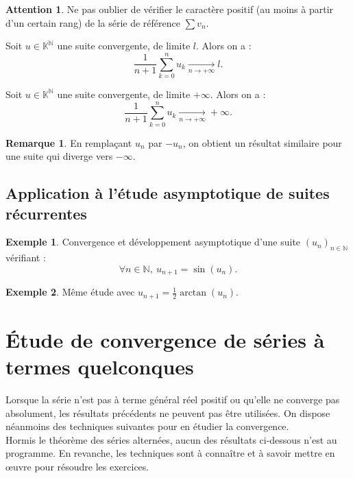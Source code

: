 \documentclass[french]{article}
\newcommand{\N}{\mathbb{N}}
\newcommand{\K}{\mathbb{K}}
\theoremstyle{plain}
\theoremstyle{definition}
\newtheorem*{ex}{Exemple}
\newtheorem*{rmq}{Remarque}
\newtheorem*{attention}{Attention}
\theoremstyle{remark}
\begin{document}
\begin{attention}
	Ne pas oublier de vérifier le caractère positif (au moins à partir d'un certain rang) de la série de référence $\displaystyle\sum v_n$.
\end{attention}

\begin{prop}%
	Soit $u\in\K^\N$ une suite convergente, de limite $l$. Alors on a : 
	$$\frac{1}{n+1}\sum_{k=0}^{n}u_k\xrightarrow[n\to+\infty]{}l.$$
\end{prop}

\begin{prop}%
	Soit $u\in\K^\N$ une suite convergente, de limite $+\infty$. Alors on a : 
	$$\frac{1}{n+1}\sum_{k=0}^{n}u_k\xrightarrow[n\to+\infty]{}+\infty.$$
\end{prop}

\begin{rmq}
	En remplaçant $u_n$ par $-u_n$, on obtient un résultat similaire pour une suite qui diverge vers $-\infty$.
\end{rmq}

\subsection{Application à l'étude asymptotique de suites récurrentes}

\begin{ex}
	Convergence et développement asymptotique d'une suite $(u_n)_{n\in\N}$ vérifiant : $$\forall n\in\N,\ u_{n+1}=\sin(u_n).$$
\end{ex}

\begin{ex}
	Même étude avec $u_{n+1}=\displaystyle\frac{1}{2}\arctan(u_n)$.
\end{ex}

\section{Étude de convergence de séries à termes quelconques}

Lorsque la série n'est pas à terme général réel positif ou qu'elle ne converge pas absolument, les résultats précédents ne peuvent pas être utilisées. On dispose néanmoins des techniques suivantes pour en étudier la convergence. \\
Hormis le théorème des séries alternées, aucun des résultats ci-dessous n'est au programme. En revanche, les techniques sont à connaître et à savoir mettre en œuvre pour résoudre les exercices.
\end{document}
